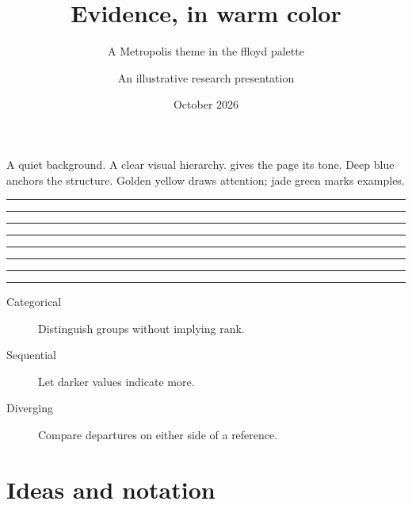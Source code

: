 \documentclass[10pt,aspectratio=169]{beamer}
\title{Evidence, in warm color}
\subtitle{A Metropolis theme in the ffloyd palette}
\author{An illustrative research presentation}
\date{October 2026}
\newcommand{\swatch}[2]{%
  \begin{minipage}[t]{0.112\textwidth}\centering
    {\color{#1}\rule{\linewidth}{0.55cm}}\par
    \vspace{0.15em}{\scriptsize #2}
  \end{minipage}\hfill}
\begin{document}
\maketitle

\begin{frame}{A quiet background. A clear visual hierarchy.}
  gives the page its tone. Deep blue anchors the structure.
  \alert{Golden yellow draws attention}; jade green marks examples.

  \vspace{1em}
  \swatch{ff_yellow}{Gold}
  \swatch{ff_green}{Jade}
  \swatch{ff_blue}{Blue}
  \swatch{ff_terracotta}{Terracotta}
  \swatch{ff_violet}{Violet}
  \swatch{ff_rose}{Rose}
  \swatch{ff_olive}{Olive}
  \swatch{ff_deep_blue}{Deep blue}

  \vspace{1.2em}
  \begin{description}
    \item[Categorical] Distinguish groups without implying rank.
    \item[Sequential] Let darker values indicate more.
    \item[Diverging] Compare departures on either side of a reference.
  \end{description}
\end{frame}

\section{Ideas and notation}
\end{document}
